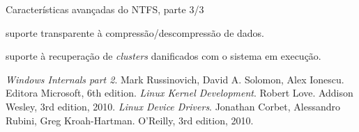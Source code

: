 \begin{frame}{Características avançadas do NTFS, parte 3/3}
  \footnotesize
  \begin{description}
  \item<1>[Compressão:] suporte transparente à compressão/descompressão de dados.
  \item<2>[Auto-recuperação:] suporte à recuperação de {\em clusters} danificados 
    com o sistema em execução.
  \end{description}
  
\end{frame}


\begin{thebibliography}{5}                                                                            
  {\em Windows Internals part 2}.
  \newblock Mark Russinovich, David A. Solomon, Alex Ionescu.
  \newblock Editora Microsoft, 6th edition.
  {\em Linux Kernel Development}.                                                                     
  \newblock Robert Love.                                                                              
  \newblock Addison Wesley, 3rd edition, 2010.                                                        
  {\em Linux Device Drivers}.                                                                         
  \newblock Jonathan Corbet, Alessandro Rubini, Greg Kroah-Hartman.                                   
  \newblock O'Reilly, 3rd edition, 2010.     
\end{thebibliography}
